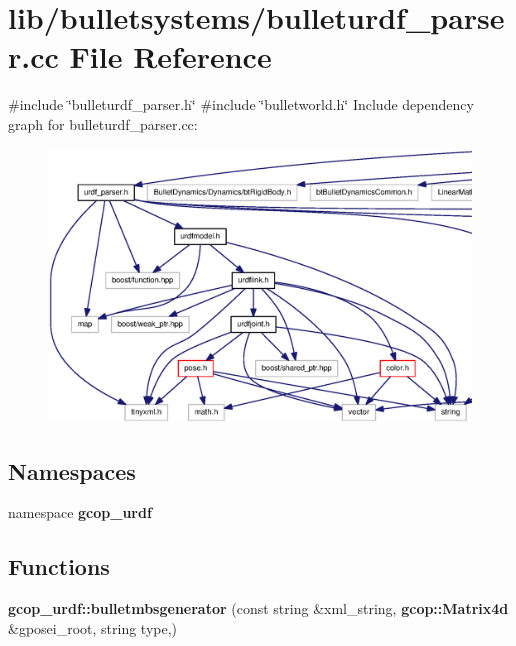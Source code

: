 \section{lib/bulletsystems/bulleturdf\-\_\-parser.cc \-File \-Reference}
\label{bulleturdf__parser_8cc}
{\ttfamily \#include \char`\"{}bulleturdf\-\_\-parser.\-h\char`\"{}}\*
{\ttfamily \#include \char`\"{}bulletworld.\-h\char`\"{}}\*
\-Include dependency graph for bulleturdf\-\_\-parser.\-cc\-:
\nopagebreak
\begin{figure}[H]
\begin{center}
\leavevmode
\includegraphics[width=350pt]{bulleturdf__parser_8cc__incl}
\end{center}
\end{figure}
\subsection*{\-Namespaces}
\begin{DoxyCompactItemize}
\item 
namespace {\bf gcop\-\_\-urdf}
\end{DoxyCompactItemize}
\subsection*{\-Functions}
\begin{DoxyCompactItemize}
\item 
{\bf gcop\-\_\-urdf\-::bulletmbsgenerator} (const string \&xml\-\_\-string, {\bf gcop\-::\-Matrix4d} \&gposei\-\_\-root, string type,)
\end{DoxyCompactItemize}
